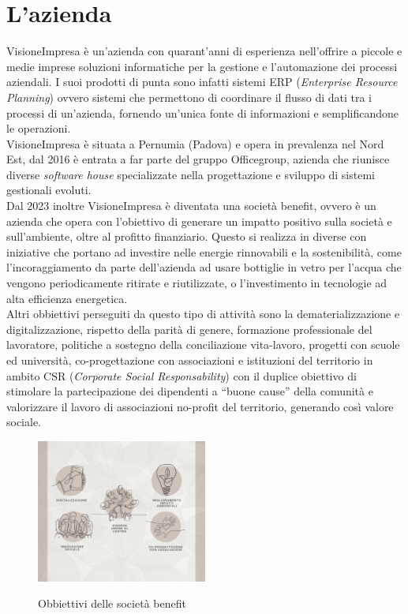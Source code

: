 \section{L'azienda}
VisioneImpresa è un'azienda con quarant'anni di esperienza nell'offrire a piccole e medie imprese soluzioni informatiche per la 
gestione e l'automazione dei processi aziendali. I suoi prodotti di punta sono infatti sistemi ERP (\textit{Enterprise 
Resource Planning}) ovvero sistemi che permettono di coordinare il flusso di dati tra i processi di un'azienda, fornendo un'unica fonte di 
informazioni e semplificandone le operazioni.\\
VisioneImpresa è situata a Pernumia (Padova) e opera in prevalenza nel Nord Est, dal 2016 è entrata a far parte del gruppo Officegroup, azienda 
che riunisce diverse \textit{software house} specializzate nella progettazione e sviluppo di sistemi gestionali evoluti.\\
Dal 2023 inoltre VisioneImpresa è diventata una società benefit, ovvero è un azienda che opera con l'obiettivo di generare un impatto positivo 
sulla società e sull'ambiente, oltre al profitto finanziario.
Questo si realizza in diverse con iniziative che portano ad investire nelle energie rinnovabili e la sostenibilità, come 
l'incoraggiamento da parte dell'azienda ad usare bottiglie in vetro per l'acqua che vengono periodicamente ritirate e 
riutilizzate, o l'investimento in tecnologie ad alta efficienza energetica.\\
Altri obbiettivi perseguiti da questo tipo di attività sono la dematerializzazione e digitalizzazione, rispetto della parità di 
genere, formazione professionale del lavoratore, politiche a sostegno della conciliazione vita-lavoro, progetti con scuole ed 
università, co-progettazione con associazioni e istituzioni del territorio in ambito CSR 
(\textit{Corporate Social Responsability}) con il duplice obiettivo di stimolare la partecipazione dei dipendenti a 
“buone cause” della comunità e valorizzare il lavoro di associazioni no-profit del territorio, generando così valore sociale.

\begin{figure}[H]
    \centering
    \includegraphics[alt={Obbiettivi delle società benefit}, width=0.5\textwidth]{img/soc-benefit.png}
    \caption{Obbiettivi delle società benefit}
    \label{fig:società benefit}
\end{figure}
